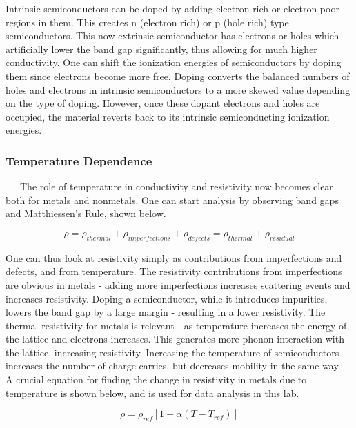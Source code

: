 \documentclass[11pt]{article}
\begin{document}
Intrinsic semiconductors can be doped by adding electron-rich or electron-poor regions in them. This creates n (electron rich) or p (hole rich) type semiconductors. This now extrinsic semiconductor has electrons or holes which artificially lower the band gap significantly, thus allowing for much higher conductivity. One can shift the ionization energies of semiconductors by doping them since electrons become more free. Doping converts the balanced numbers of holes and electrons in intrinsic semiconductors to a more skewed value depending on the type of doping. However, once these dopant electrons and holes are occupied, the material reverts back to its intrinsic semiconducting ionization energies.

\subsubsection*{Temperature Dependence}
\ \ \ The role of temperature in conductivity and resistivity now becomes clear both for metals and nonmetals. One can start analysis by observing band gaps and Matthiessen's Rule, shown below.

\begin{equation}
\rho = \rho_{thermal} + \rho_{imperfections} + \rho_{defects} = \rho_{thermal} + \rho_{residual}
\end{equation}

One can thus look at resistivity simply as contributions from imperfections and defects, and from temperature. The resistivity contributions from imperfections are obvious in metals - adding more imperfections increases scattering events and increases resistivity. Doping a semiconductor, while it introduces impurities, lowers the band gap by a large margin - resulting in a lower resistivity. The thermal resistivity for metals is relevant - as temperature increases the energy of the lattice and electrons increases. This generates more phonon interaction with the lattice, increasing resistivity. Increasing the temperature of semiconductors increases the number of charge carries, but decreases mobility in the same way.\\

A crucial equation for finding the change in resistivity in metals due to temperature is shown below, and is used for data analysis in this lab.

\begin{equation}
\rho = \rho_{ref}[1 + \alpha(T - T_{ref})]
\end{equation}
\end{document}
